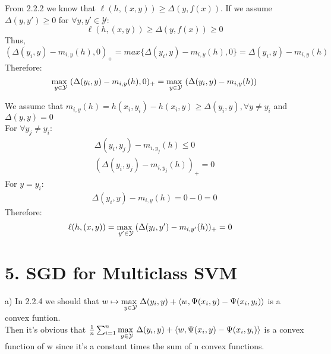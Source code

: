 \documentclass{article}
\newenvironment{sub}[2][$-$]{\begin{trivlist}
		\item[\hskip \labelsep {\bfseries #1}\hskip \labelsep {\bfseries #2.}]}  {\end{trivlist}}
\begin{document}
\begin{sub}{4.2}
\end{sub}
From 2.2.2 we know that $\ell(h,(x,y)) \geq \Delta(y,f(x))$. If we assume $\Delta(y,y') \geq 0$ for $\forall y,y' \in \mathcal{Y}$:
$$\ell(h,(x,y)) \geq \Delta(y,f(x)) \geq 0$$
Thus, $(\Delta(y_i,y)   - m_{i,y}(h),0)_+ =max \{\Delta(y_i,y)   - m_{i,y}(h),0\} = \Delta(y_i,y)   - m_{i,y}(h)$\\ 
Therefore:
$$\underset{y \in \mathcal{Y}}{\operatorname{max \hspace{0.05 in}}}  (\Delta(y_i,y)   - m_{i,y}(h),0)_+ = \underset{y \in \mathcal{Y}}{\operatorname{max \hspace{0.05 in}}} (\Delta(y_i,y)   - m_{i,y}(h))$$

\begin{sub}{4.3}
\end{sub}
We assume that $m_{i,y} (h) = h(x_i,y_i) - h(x_i,y) \geq \Delta(y_i,y) ,\forall y \neq y_i$ and $\Delta(y,y) = 0$\\
For $\forall y_j \neq y_i$:
\begin{align}
\Delta(y_i,y_j)-m_{i,y_j}(h) \leq 0\\
(\Delta(y_i,y_j)-m_{i,y_j}(h))_+ = 0
\end{align}  
For $y = y_i$:
\begin{align}
\Delta(y_i,y)-m_{i,y}(h) =0 - 0 = 0
\end{align}  
Therefore:
 \begin{align}
\ell(h,(x,y)) &= \underset{y' \in \mathcal{Y}}{\operatorname{max \hspace{0.05 in}}}  (\Delta(y_i,y')   - m_{i,y'}(h))_+ = 0
 \end{align}

\section{5. SGD for Multiclass SVM}
\begin{sub}{5.1}
\end{sub}
a) In 2.2.4 we should that $w \mapsto \underset{y \in \mathcal{Y}}{\operatorname{max \hspace{0.05 in}}} \Delta(y_i,y)   +\langle w, \Psi(x_i,y) - \Psi(x_i,y_i) \rangle $ is a convex funtion. \\
Then it's obvious that $\frac{1}{n} \sum_{i=1}^{n}\underset{y \in \mathcal{Y}}{\operatorname{max \hspace{0.05 in}}} \Delta(y_i,y)   +\langle w, \Psi(x_i,y) - \Psi(x_i,y_i) \rangle $ is a convex function of w since it's a constant times the sum of n convex functions. \\
\end{document}
